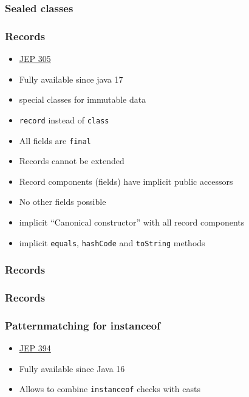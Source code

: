 \documentclass{beamer}
\begin{document}
\begin{frame}
\frametitle{Sealed classes}





\end{frame}

\begin{frame}
\frametitle{Records}
\begin{itemize}
  \item \href{https://openjdk.org/jeps/395}{JEP 305}
  \item Fully available since java 17
  \pause
  \item special classes for immutable data
  \item \texttt{record} instead of \texttt{class}
  \item All fields are \texttt{final}
  \item Records cannot be extended
  \item Record components (fields) have implicit public accessors
  \item No other fields possible
  \item implicit ``Canonical constructor'' with all record components
  \item implicit \texttt{equals}, \texttt{hashCode} and \texttt{toString} methods
\end{itemize}
\end{frame}
\begin{frame}
\frametitle{Records}

\end{frame}
\begin{frame}
\frametitle{Records}

\end{frame}

\begin{frame}
\frametitle{Patternmatching for instanceof}
\begin{itemize}
  \item \href{https://openjdk.org/jeps/394}{JEP 394}
  \item Fully available since Java 16
  \pause
  \item Allows to combine \texttt{instanceof} checks with casts
\end{itemize}
\pause

\end{frame}
\end{document}
